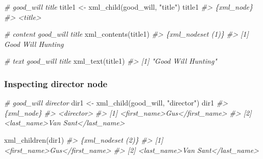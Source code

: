 \documentclass[
]{book}
\newenvironment{Shaded}{\begin{snugshade}}{\end{snugshade}}
\newcommand{\CommentTok}[1]{\textcolor[rgb]{0.56,0.35,0.01}{\textit{#1}}}
\newcommand{\FunctionTok}[1]{\textcolor[rgb]{0.00,0.00,0.00}{#1}}
\newcommand{\NormalTok}[1]{#1}
\newcommand{\OtherTok}[1]{\textcolor[rgb]{0.56,0.35,0.01}{#1}}
\newcommand{\StringTok}[1]{\textcolor[rgb]{0.31,0.60,0.02}{#1}}
\begin{document}
\begin{Shaded}
\begin{Highlighting}[]
\CommentTok{\# good\_will title}
\NormalTok{title1 }\OtherTok{\textless{}{-}} \FunctionTok{xml\_child}\NormalTok{(good\_will, }\StringTok{"title"}\NormalTok{)}
\NormalTok{title1}
\CommentTok{\#\textgreater{} \{xml\_node\}}
\CommentTok{\#\textgreater{} \textless{}title\textgreater{}}

\CommentTok{\# content good\_will title}
\FunctionTok{xml\_contents}\NormalTok{(title1)}
\CommentTok{\#\textgreater{} \{xml\_nodeset (1)\}}
\CommentTok{\#\textgreater{} [1] Good Will Hunting}

\CommentTok{\# text good\_will title}
\FunctionTok{xml\_text}\NormalTok{(title1)}
\CommentTok{\#\textgreater{} [1] "Good Will Hunting"}
\end{Highlighting}
\end{Shaded}

\hypertarget{inspecting-director-node}{%
\subsubsection{Inspecting director node}\label{inspecting-director-node}}

\begin{Shaded}
\begin{Highlighting}[]
\CommentTok{\# good\_will director}
\NormalTok{dir1 }\OtherTok{\textless{}{-}} \FunctionTok{xml\_child}\NormalTok{(good\_will, }\StringTok{"director"}\NormalTok{)}
\NormalTok{dir1}
\CommentTok{\#\textgreater{} \{xml\_node\}}
\CommentTok{\#\textgreater{} \textless{}director\textgreater{}}
\CommentTok{\#\textgreater{} [1] \textless{}first\_name\textgreater{}Gus\textless{}/first\_name\textgreater{}}
\CommentTok{\#\textgreater{} [2] \textless{}last\_name\textgreater{}Van Sant\textless{}/last\_name\textgreater{}}
\end{Highlighting}
\end{Shaded}

\begin{Shaded}
\begin{Highlighting}[]
\FunctionTok{xml\_children}\NormalTok{(dir1)}
\CommentTok{\#\textgreater{} \{xml\_nodeset (2)\}}
\CommentTok{\#\textgreater{} [1] \textless{}first\_name\textgreater{}Gus\textless{}/first\_name\textgreater{}}
\CommentTok{\#\textgreater{} [2] \textless{}last\_name\textgreater{}Van Sant\textless{}/last\_name\textgreater{}}
\end{Highlighting}
\end{Shaded}
\end{document}
